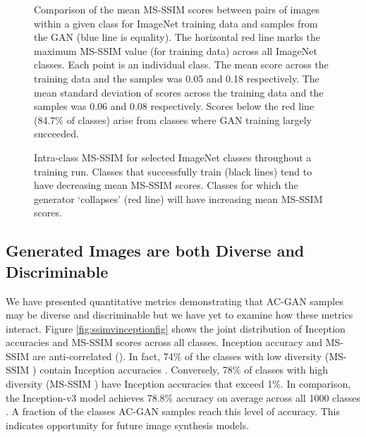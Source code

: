 \documentclass{article}
\begin{document}
\begin{figure}[t]
\centering
\caption{Comparison of the mean MS-SSIM scores between pairs of images within a given class for ImageNet training data and samples from the GAN (blue line is equality).
The horizontal red line marks the maximum MS-SSIM value (for training data) across all
ImageNet classes.
  Each point is an individual class.
  The mean score across the training data and the samples was 0.05 and 0.18 respectively.
  The mean standard deviation of scores across the training data and the samples was 0.06 and 0.08 respectively.
Scores below the red line (84.7\% of classes) arise from classes where GAN training largely
succeeded.
}
\label{fig:ssimhist}
\end{figure}

\begin{figure}[t]
\centering
\caption{Intra-class MS-SSIM for selected ImageNet classes throughout a training run.
Classes that successfully train (black lines) tend to have decreasing mean MS-SSIM scores.
Classes for which the generator `collapses' (red line) will have increasing mean MS-SSIM scores.
}
\label{fig:ssimhist2}
\end{figure}


\subsection{Generated Images are both Diverse and Discriminable} \label{section:correlation}

We have presented quantitative metrics demonstrating that AC-GAN
samples may be diverse and discriminable but we have yet
to examine how these metrics interact.
Figure \ref{fig:ssimvinceptionfig} shows the joint distribution of Inception accuracies
and MS-SSIM scores across all classes.
Inception accuracy and MS-SSIM are anti-correlated ().
In fact, 74\% of the classes with low diversity (MS-SSIM )
contain Inception accuracies .
Conversely, 78\% of classes with high diversity (MS-SSIM )
have Inception accuracies that exceed 1\%. In comparison, the Inception-v3 model
achieves 78.8\% accuracy on average across all 1000 classes \citep{szegedy2015rethinking}.
A fraction of
the classes AC-GAN samples reach this level of accuracy.
This indicates opportunity for future image synthesis
models. 
\end{document}
